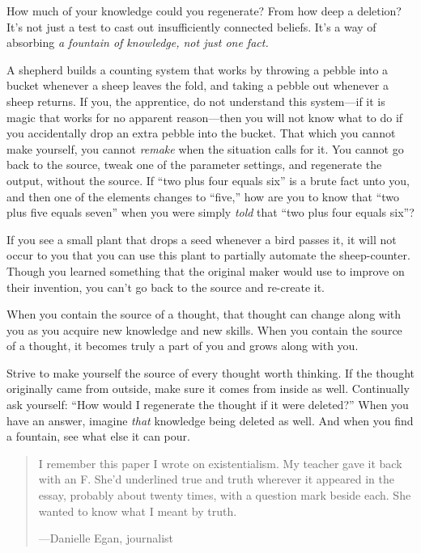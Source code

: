 {
 How much of your knowledge could you regenerate? From how deep a
deletion? It's not just a test to cast out
insufficiently connected beliefs. It's a way of
absorbing \textit{a fountain of knowledge, not just one fact.}}

{
 A shepherd builds a counting system that works by throwing a
pebble into a bucket whenever a sheep leaves the fold, and taking a
pebble out whenever a sheep returns. If you, the apprentice, do not
understand this system---if it is magic that works for no apparent
reason---then you will not know what to do if you accidentally drop an
extra pebble into the bucket. That which you cannot make yourself, you
cannot \textit{remake} when the situation calls for it. You cannot go
back to the source, tweak one of the parameter settings, and regenerate
the output, without the source. If ``two plus four
equals six'' is a brute fact unto you, and then one
of the elements changes to ``five,''
how are you to know that ``two plus five equals
seven'' when you were simply \textit{told} that
``two plus four equals six''?}

{
 If you see a small plant that drops a seed whenever a bird passes
it, it will not occur to you that you can use this plant to partially
automate the sheep-counter. Though you learned something that the
original maker would use to improve on their invention, you
can't go back to the source and re-create it.}

{
 When you contain the source of a thought, that thought can change
along with you as you acquire new knowledge and new skills. When you
contain the source of a thought, it becomes truly a part of you and
grows along with you.}

{
 Strive to make yourself the source of every thought worth
thinking. If the thought originally came from outside, make sure it
comes from inside as well. Continually ask yourself:
``How would I regenerate the thought if it were
deleted?'' When you have an answer, imagine
\textit{that} knowledge being deleted as well. And when you find a
fountain, see what else it can pour.}

\myendsectiontext


\bigskip

\label{the_simple_truth}

\begin{quote}
{
 I remember this paper I wrote on existentialism. My teacher gave
it back with an F. She'd underlined true and truth
wherever it appeared in the essay, probably about twenty times, with a
question mark beside each. She wanted to know what I meant by truth.}

{\raggedleft
 {}---Danielle Egan, journalist
\par}
\end{quote}


